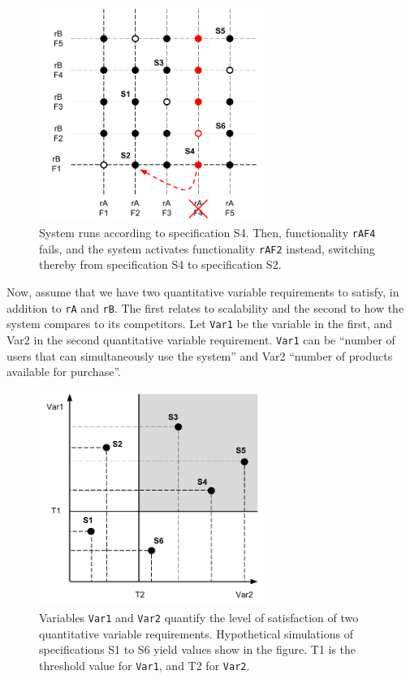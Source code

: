 \documentclass[graybox]{svmult}
\newcommand{\xt}[1]{\texttt{#1}}
\newcommand{\req}[1]{\xt{#1}}
\begin{document}
\begin{figure}[t]
	\centering
	\includegraphics[height=70mm]{Figures/f-ex-specifications-switch}
\caption{System runs according to specification S4. Then, functionality \req{rAF4} fails, and the system activates functionality \req{rAF2} instead, switching thereby from specification S4 to specification S2.}
\label{f:ex:specifications-switch}
\end{figure}

Now, assume that we have two quantitative variable requirements to satisfy, in addition to \req{rA} and \req{rB}. The first relates to scalability and the second to how the system compares to its competitors. Let \req{Var1} be the variable in the first, and Var2 in the second quantitative variable requirement. \req{Var1} can be ``number of users that can simultaneously use the system'' and Var2 ``number of products available for purchase''. 

\begin{figure}[t]
	\centering
	\includegraphics[height=70mm]{Figures/f-ex-mapping}
\caption{Variables \req{Var1} and \req{Var2} quantify the level of satisfaction of two quantitative variable requirements. Hypothetical simulations of specifications S1 to S6 yield values show in the figure. T1 is the threshold value for \req{Var1}, and T2 for \req{Var2}.}
\label{f:ex:mapping}
\end{figure}
\end{document}
